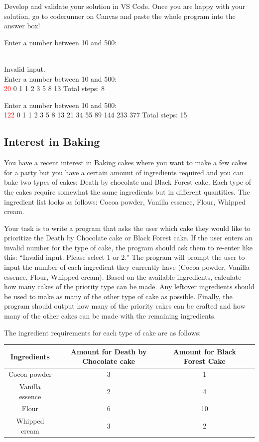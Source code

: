 Develop and validate your solution in VS Code. Once you are happy with your solution, go to coderunner on Canvas and paste the whole program into the answer box!

\begin{sample}
Enter a number between 10 and 500:

\\Invalid input. 
\\Enter a number between 10 and 500: 
\\\textcolor{red}{20} 
0 
1 
1 
2 
3 
5 
8 
13 
Total steps: 8 
\end{sample} 
\begin{sample} Enter a number between 10 and 500: \\\textcolor{red}{122} 
0 
1 
1 
2 
3 
5 
8 
13 
21 
34 
55 
89 
144 
233 
377 
Total steps: 15 
\end{sample}


\subsection{Interest in Baking}
You have a recent interest in Baking cakes where you want to make a few cakes for a party but you have a certain amount of ingredients required and you can bake two types of cakes: Death by chocolate and Black Forest cake. Each type of the cakes require somewhat the same ingredients but in different quantities. The ingredient list looks as follows: Cocoa powder, Vanilla essence, Flour, Whipped cream. 

\bigbreak
Your task is to write a program that asks the user which cake they would like to prioritize the Death by Chocolate cake or Black Forest cake. If the user enters an invalid number for the type of cake, the program should ask them to re-enter like this: ``Invalid input. Please select 1 or 2." The program will prompt the user to input the number of each ingredient they currently have (Cocoa powder, Vanilla essence, Flour, Whipped cream). Based on the available ingredients, calculate how many cakes of the priority type can be made. Any leftover ingredients should be used to make as many of the other type of cake as possible. Finally, the program should output how many of the priority cakes can be crafted and how many of the other cakes can be made with the remaining ingredients. 

The ingredient requirements for each type of cake are as follows:

\begin{table}[H]
    \centering
       \begin{tabular}{|c|c|c|c|}
    \hline
    \textbf{Ingredients} & \textbf{Amount for Death by Chocolate cake } &\textbf{Amount for Black Forest Cake} 
    \\
    \hline
    Cocoa powder & 3 & 1
    \\
    \hline
    Vanilla essence & 2 & 4
    \\
    \hline
    Flour & 6 & 10 \\
     \hline
    Whipped cream & 3 & 2 \\
    \hline
    \end{tabular}

\end{table}

